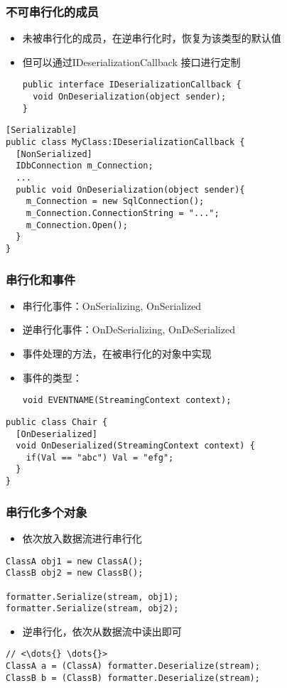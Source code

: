 \begin{frame}[fragile]
\frametitle{不可串行化的成员}
\begin{itemize}
\item 未被串行化的成员，在逆串行化时，恢复为该类型的默认值
\item 但可以通过IDeserializationCallback 接口进行定制
\begin{lstlisting}
public interface IDeserializationCallback {
  void OnDeserialization(object sender);
}
\end{lstlisting}
\end{itemize}
\begin{lstlisting}
[Serializable]
public class MyClass:IDeserializationCallback {
  [NonSerialized]
  IDbConnection m_Connection;
  ...
  public void OnDeserialization(object sender){
    m_Connection = new SqlConnection();
    m_Connection.ConnectionString = "...";
    m_Connection.Open();
  }
}
\end{lstlisting}
\end{frame}

\begin{frame}[fragile]
\frametitle{串行化和事件}
\begin{itemize}
\item 串行化事件：OnSerializing, OnSerialized
\item 逆串行化事件：OnDeSerializing, OnDeSerialized
\item 事件处理的方法，在被串行化的对象中实现
\item 事件的类型：
\begin{lstlisting}
void EVENTNAME(StreamingContext context);
\end{lstlisting}
\end{itemize}
\begin{lstlisting}
public class Chair {
  [OnDeserialized]
  void OnDeserialized(StreamingContext context) {
    if(Val == "abc") Val = "efg";
  }
}
\end{lstlisting}
\end{frame}

\begin{frame}[fragile]
\frametitle{串行化多个对象}
\begin{itemize}
\item 依次放入数据流进行串行化
\end{itemize}
\begin{lstlisting}
ClassA obj1 = new ClassA();
ClassB obj2 = new ClassB();

formatter.Serialize(stream, obj1);
formatter.Serialize(stream, obj2);

\end{lstlisting}
\begin{itemize}
\item 逆串行化，依次从数据流中读出即可
\end{itemize}
\begin{lstlisting}[escapeinside=<>]
// <\dots{} \dots{}>
ClassA a = (ClassA) formatter.Deserialize(stream);
ClassB b = (ClassB) formatter.Deserialize(stream);
\end{lstlisting}
\end{frame}


